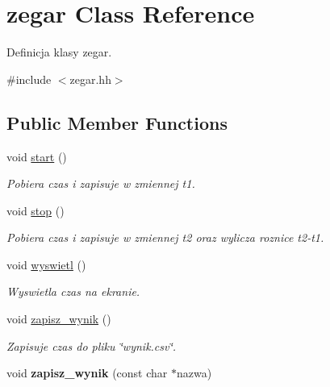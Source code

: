 \hypertarget{classzegar}{\section{zegar \-Class \-Reference}
\label{classzegar}
}


\-Definicja klasy zegar.  




{\ttfamily \#include $<$zegar.\-hh$>$}

\subsection*{\-Public \-Member \-Functions}
\begin{DoxyCompactItemize}
\item 
\hypertarget{classzegar_a20f54bf635dd6b8fa3729a898dee0b02}{void \hyperlink{classzegar_a20f54bf635dd6b8fa3729a898dee0b02}{start} ()}\label{classzegar_a20f54bf635dd6b8fa3729a898dee0b02}

\begin{DoxyCompactList}\small\item\em \-Pobiera czas i zapisuje w zmiennej t1. \end{DoxyCompactList}\item 
\hypertarget{classzegar_a11470b47ba97baeb33376062c8765e29}{void \hyperlink{classzegar_a11470b47ba97baeb33376062c8765e29}{stop} ()}\label{classzegar_a11470b47ba97baeb33376062c8765e29}

\begin{DoxyCompactList}\small\item\em \-Pobiera czas i zapisuje w zmiennej t2 oraz wylicza roznice t2-\/t1. \end{DoxyCompactList}\item 
\hypertarget{classzegar_adefab1d01ca1e95b6a6cf31c7322f78d}{void \hyperlink{classzegar_adefab1d01ca1e95b6a6cf31c7322f78d}{wyswietl} ()}\label{classzegar_adefab1d01ca1e95b6a6cf31c7322f78d}

\begin{DoxyCompactList}\small\item\em \-Wyswietla czas na ekranie. \end{DoxyCompactList}\item 
\hypertarget{classzegar_af63513dc1f53641aad781ebf8c502c27}{void \hyperlink{classzegar_af63513dc1f53641aad781ebf8c502c27}{zapisz\-\_\-wynik} ()}\label{classzegar_af63513dc1f53641aad781ebf8c502c27}

\begin{DoxyCompactList}\small\item\em \-Zapisuje czas do pliku \char`\"{}wynik.\-csv\char`\"{}. \end{DoxyCompactList}\item 
\hypertarget{classzegar_a8b17a25c75a2866f6660fff4230e4155}{void {\bfseries zapisz\-\_\-wynik} (const char $\ast$nazwa)}\label{classzegar_a8b17a25c75a2866f6660fff4230e4155}

\end{DoxyCompactItemize}
